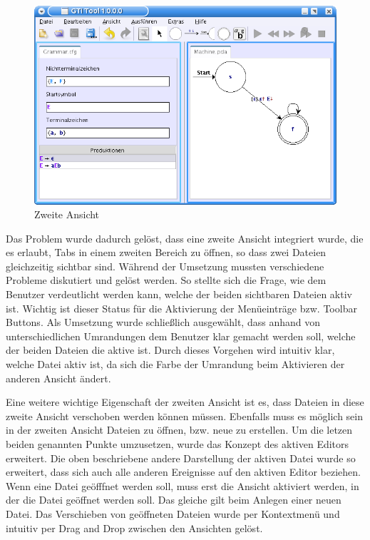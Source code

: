 \begin{figure}[h!]
\begin{center}
\includegraphics[width=12cm]{../images/second_view.png}
\caption{Zweite Ansicht}
\end{center}
\end{figure}
\vspace{10pt}

Das Problem wurde dadurch gelöst, dass eine zweite Ansicht integriert wurde,
die es erlaubt, Tabs in einem zweiten Bereich zu öffnen, so dass zwei Dateien
gleichzeitig sichtbar sind. Während der Umsetzung mussten verschiedene Probleme
diskutiert und gelöst werden. So stellte sich die Frage, wie dem Benutzer
verdeutlicht werden kann, welche der beiden sichtbaren Dateien aktiv ist.
Wichtig ist dieser Status für die Aktivierung der Menüeinträge bzw. Toolbar
Buttons. Als Umsetzung wurde schließlich ausgewählt, dass anhand von
unterschiedlichen Umrandungen dem Benutzer klar gemacht werden soll, welche der
beiden Dateien die aktive ist. Durch dieses Vorgehen wird intuitiv klar, welche
Datei aktiv ist, da sich die Farbe der Umrandung beim Aktivieren der anderen
Ansicht ändert.\vspace{10pt}

Eine weitere wichtige Eigenschaft der zweiten Ansicht ist es, dass Dateien in
diese zweite Ansicht verschoben werden können müssen. Ebenfalls muss es möglich
sein in der zweiten Ansicht Dateien zu öffnen, bzw. neue zu erstellen. Um die
letzen beiden genannten Punkte umzusetzen, wurde das Konzept des aktiven
Editors erweitert. Die oben beschriebene andere Darstellung der aktiven Datei
wurde so erweitert, dass sich auch alle anderen Ereignisse auf den aktiven
Editor beziehen. Wenn eine Datei geöfffnet werden soll, muss erst die Ansicht
aktiviert werden, in der die Datei geöffnet werden soll. Das gleiche gilt beim
Anlegen einer neuen Datei. Das Verschieben von geöffneten Dateien wurde per
Kontextmenü und intuitiv per Drag and Drop zwischen den Ansichten
gelöst.\vspace{10pt}
